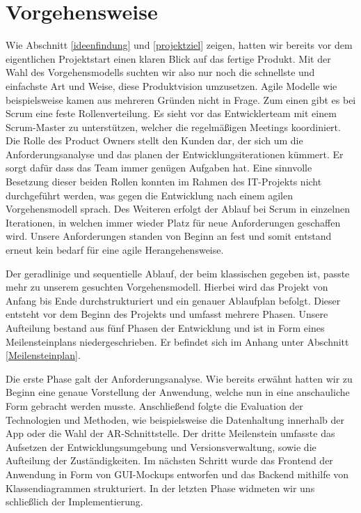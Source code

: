 \section{Vorgehensweise}
Wie Abschnitt \ref{ideenfindung} und \ref{projektziel} zeigen, hatten wir bereits vor dem eigentlichen Projektstart einen klaren Blick auf das fertige Produkt.
Mit der Wahl des Vorgehensmodells suchten wir also nur noch die schnellste und einfachste Art und Weise, diese Produktvision umzusetzen. 
Agile Modelle wie beispielsweise  kamen aus mehreren Gründen nicht in Frage. 
Zum einen gibt es bei Scrum eine feste Rollenverteilung. 
Es sieht vor das Entwicklerteam mit einem Scrum-Master zu unterstützen, welcher die regelmäßigen Meetings koordiniert. 
Die Rolle des Product Owners stellt den Kunden dar, der sich um die Anforderungsanalyse und das planen der Entwicklungsiterationen kümmert. 
Er sorgt dafür dass das Team immer genügen Aufgaben hat. 
Eine sinnvolle Besetzung dieser beiden Rollen konnten im Rahmen des IT-Projekts nicht durchgeführt werden, was gegen die Entwicklung nach einem agilen Vorgehensmodell sprach.
Des Weiteren erfolgt der Ablauf bei Scrum in einzelnen Iterationen, in welchen immer wieder Platz für neue Anforderungen geschaffen wird. 
Unsere Anforderungen standen von Beginn an fest und somit entstand erneut kein bedarf für eine agile Herangehensweise.

Der geradlinige und sequentielle Ablauf, der beim klassischen  gegeben ist, passte mehr zu unserem gesuchten Vorgehensmodell.
Hierbei wird das Projekt von Anfang bis Ende durchstrukturiert und ein genauer Ablaufplan befolgt.
Dieser entsteht vor dem Beginn des Projekts und umfasst mehrere Phasen. 
Unsere Aufteilung bestand aus fünf Phasen der Entwicklung und ist in Form eines Meilensteinplans niedergeschrieben. Er befindet sich im Anhang unter Abschnitt \ref{Meilensteinplan}.

Die erste Phase galt der Anforderungsanalyse. 
Wie bereits erwähnt hatten wir zu Beginn eine genaue Vorstellung der Anwendung, welche nun in eine anschauliche Form gebracht werden musste. 
Anschließend folgte die Evaluation der Technologien und Methoden, wie beispielsweise die Datenhaltung innerhalb der App oder die Wahl der AR-Schnittstelle.
Der dritte Meilenstein umfasste das Aufsetzen der Entwicklungsumgebung und Versionsverwaltung, sowie die Aufteilung der Zuständigkeiten.
Im nächsten Schritt wurde das Frontend der Anwendung in Form von GUI-Mockups entworfen und das Backend mithilfe von Klassendiagrammen strukturiert.
In der letzten Phase widmeten wir uns schließlich der Implementierung.
